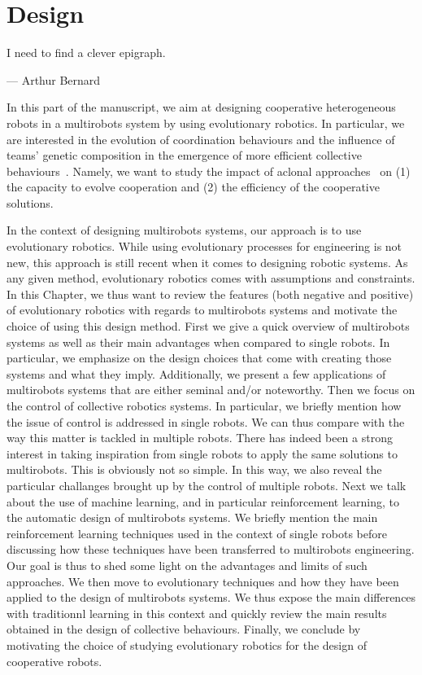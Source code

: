 \chapter{Design}
\label{chapter:design}

\epigraph{I need to find a clever epigraph.}{--- \textup{Arthur Bernard}}

\minitoc[n] %

In this part of the manuscript, we aim at designing cooperative heterogeneous robots in a multirobots system by using evolutionary robotics. In particular, we are interested in the evolution of coordination behaviours and the influence of teams' genetic composition in the emergence of more efficient collective behaviours~\parencite{Waibel2009}. Namely, we want to study the impact of aclonal approaches~\parencite{Quinn2001} on (1) the capacity to evolve cooperation and (2) the efficiency of the cooperative solutions.


In the context of designing multirobots systems, our approach is to use evolutionary robotics. While using evolutionary processes for engineering is not new, this approach is still recent when it comes to designing robotic systems. As any given method, evolutionary robotics comes with assumptions and constraints. In this Chapter, we thus want to review the features (both negative and positive) of evolutionary robotics with regards to multirobots systems and motivate the choice of using this design method. First we give a quick overview of multirobots systems as well as their main advantages when compared to single robots. In particular, we emphasize on the design choices that come with creating those systems and what they imply. Additionally, we present a few applications of multirobots systems that are either seminal and/or noteworthy. Then we focus on the control of collective robotics systems. In particular, we briefly mention how the issue of control is addressed in single robots. We can thus compare with the way this matter is tackled in multiple robots. There has indeed been a strong interest in taking inspiration from single robots to apply the same solutions to multirobots. This is obviously not so simple. In this way, we also reveal the particular challanges brought up by the control of multiple robots. Next we talk about the use of machine learning, and in particular reinforcement learning, to the automatic design of multirobots systems. We briefly mention the main reinforcement learning techniques used in the context of single robots before discussing how these techniques have been transferred to multirobots engineering. Our goal is thus to shed some light on the advantages and limits of such approaches. We then move to evolutionary techniques and how they have been applied to the design of multirobots systems. We thus expose the main differences with traditionnl learning in this context and quickly review the main results obtained in the design of collective behaviours. Finally, we conclude by motivating the choice of studying evolutionary robotics for the design of cooperative robots.


